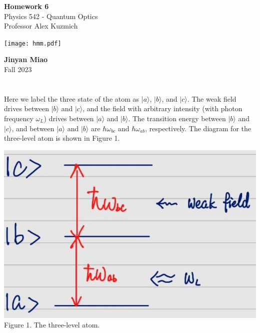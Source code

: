 \documentclass[11pt, oneside]{book}
\theoremstyle{break}
\theoremstyle{break}
\begin{document}
	\begin{titlepage}
		\begin{center}
			\vspace*{0.5cm}
			\Huge \color{red}
				\textbf{Homework 6}\\
			\vspace{0.5cm}			
			\Large \color{black}
			Physics 542 - Quantum Optics\\
			Professor Alex Kuzmich
			\vspace{1.5cm}

			\texttt{[image: hmm.pdf]}
			
			
			\vspace{2cm}
			\LARGE
				\textbf{Jinyan Miao}\\
				\hfill\break
				\LARGE Fall 2023\\
			\vspace{1cm}

		\vspace*{\fill}
		\end{center}			
	\end{titlepage}

\chapter{}
Here we label the three state of the atom as $|a\rangle$, $|b\rangle$, and $|c\rangle$. The weak field drives between $|b\rangle$ and $|c\rangle$, and the field with arbitrary intensity (with photon frequency $\omega_L$) drives between $|a\rangle$ and $|b\rangle$. The transition energy between $|b\rangle$ and $|c\rangle$, and between $|a\rangle$ and $|b\rangle$ are $\hbar \omega_{bc}$ and $\hbar \omega_{ab}$, respectively. The diagram for the three-level atom is shown in Figure 1. \\
\begin{center}
\includegraphics[scale=0.36]{542HW6/1}\\
Figure 1. The three-level atom.
\end{center}
\end{document}
